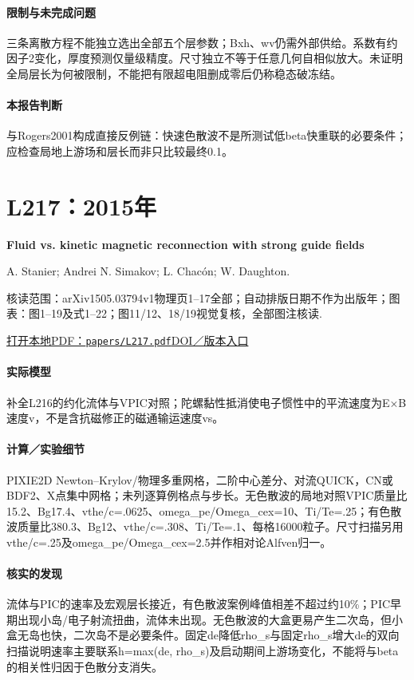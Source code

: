\paragraph{限制与未完成问题}三条离散方程不能独立选出全部五个层参数；Bxh、wv仍需外部供给。系数有约因子2变化，厚度预测仅量级精度。尺寸独立不等于任意几何自相似放大。未证明全局层长为何被限制，不能把有限超电阻删成零后仍称稳态破冻结。

\paragraph{本报告判断}与Rogers2001构成直接反例链：快速色散波不是所测试低beta快重联的必要条件；应检查局地上游场和层长而非只比较最终0.1。

\section{L217：2015年}\label{paper:L217}

\textbf{Fluid vs. kinetic magnetic reconnection with strong guide fields}\citep{L217}\

A. Stanier;  Andrei N. Simakov;  L. Chacón;  W. Daughton.

\textsf{核读范围：}arXiv1505.03794v1物理页1–17全部；自动排版日期不作为出版年；\textsf{图表：}图1–19及式1–22；图11/12、18/19视觉复核，全部图注核读.

\href{run:papers/L217.pdf}{打开本地PDF：\texttt{papers/L217.pdf}}\quad\href{https://doi.org/10.1063/1.4932330}{DOI／版本入口}

\paragraph{实际模型}补全L216的约化流体与VPIC对照；陀螺黏性抵消使电子惯性中的平流速度为E×B速度v，不是含抗磁修正的磁通输运速度vs。

\paragraph{计算／实验细节}PIXIE2D Newton–Krylov/物理多重网格，二阶中心差分、对流QUICK，CN或BDF2、X点集中网格；未列逐算例格点与步长。无色散波的局地对照VPIC质量比15.2、Bg17.4、vthe/c=.0625、omega\_pe/Omega\_cex=10、Ti/Te=.25；有色散波质量比380.3、Bg12、vthe/c=.308、Ti/Te=.1、每格16000粒子。尺寸扫描另用vthe/c=.25及omega\_pe/Omega\_cex=2.5并作相对论Alfven归一。

\paragraph{核实的发现}流体与PIC的速率及宏观层长接近，有色散波案例峰值相差不超过约10\%；PIC早期出现小岛/电子射流扭曲，流体未出现。无色散波的大盒更易产生二次岛，但小盒无岛也快，二次岛不是必要条件。固定de降低rho\_s与固定rho\_s增大de的双向扫描说明速率主要联系h=max(de, rho\_s)及启动期间上游场变化，不能将与beta的相关性归因于色散分支消失。

